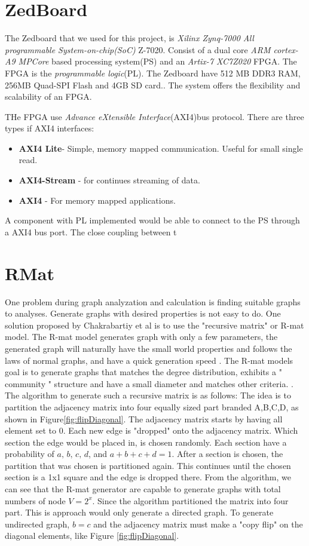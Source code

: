 \section{ZedBoard}
The Zedboard that we used for this project, is \textit{Xilinx Zynq-7000 All programmable System-on-chip(SoC)} Z-7020. Consist of a dual core \textit{ARM cortex-A9 MPCore} based processing system(PS) and an \textit{Artix-7 XC7Z020} FPGA. The FPGA is the \textit{programmable logic}(PL). The Zedboard have 512 MB DDR3 RAM, 256MB Quad-SPI Flash and 4GB SD card.\cite{FPGASoCManual}. The system offers the flexibility and scalability of an FPGA\citep{FPGAOVERVIEW}. 

THe FPGA use \textit{Advance eXtensible Interface}(AXI4)bus protocol. There are three types if AXI4 interfaces:
\begin{itemize}
\item \textbf{AXI4 Lite}- Simple, memory mapped communication. Useful for small single read.
\item \textbf{AXI4-Stream} - for continues streaming of data.
\item \textbf{AXI4} - For memory mapped applications.
\end{itemize} 

A component with PL implemented would be able to connect to the PS through a AXI4 bus port. The close coupling between t


\section{RMat} \label{rmat}
One problem during graph analyzation and calculation is finding suitable graphs to analyses. Generate graphs with desired properties is not easy to do. One solution proposed by Chakrabartiy et al is to use the "recursive matrix" or R-mat model. The R-mat model generates graph with only a few parameters, the generated graph will naturally have the small world properties and follows the laws of normal graphs, and have a quick generation speed \cite{Rmat2004}. The R-mat models goal is to generate graphs that matches the degree distribution, exhibits a " community " structure and have a small diameter and matches other criteria. \cite{Rmat2004}. The algorithm to generate such a recursive matrix is as follows: The idea is to partition the adjacency matrix into four equally sized part branded A,B,C,D, as shown in Figure\ref{fig:flipDiagonal}. The adjacency matrix starts by having all element set to 0. Each new edge is "dropped" onto the adjacency matrix. Which section the edge would be placed in, is chosen randomly. Each section have a probability of $\textit{a, b, c, d}$, and $a + b + c + d = 1$. After a section is chosen, the partition that was chosen is partitioned again. This continues until the chosen section is a 1x1 square and the edge is dropped there. From the algorithm, we can see that the R-mat generator are capable to generate graphs with total numbers of node $ \textit{V} = 2^x$. Since the algorithm partitioned the matrix into four part. This is approach would only generate a directed graph. To generate undirected graph, $b = c$ and the adjacency matrix must make a "copy flip" on the diagonal elements, like Figure \ref{fig:flipDiagonal}. 

